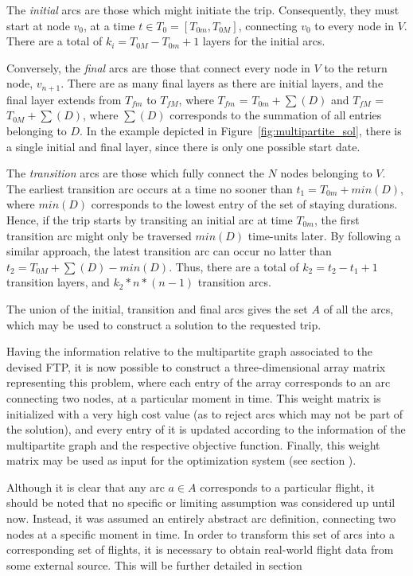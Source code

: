 The \textit{initial} arcs are those which might initiate the trip. Consequently,
they must start at node $v_0$, at a time $t \in T_0 = [T_{0m}, T_{0M}]$,
connecting $v_0$ to every node in $V$. There are a total of $k_i = T_{0M} -
T_{0m} + 1$ layers for the initial arcs.

Conversely, the \textit{final} arcs are those that connect every node in $V$ to
the return node, $v_{n+1}$. There are as many final layers as there are initial
layers, and the final layer extends from $T_{fm}$ to $T_{fM}$, where $T_{fm}$ =
$T_{0m} + \sum(D)$ and $T_{fM}$ = $T_{0M} + \sum(D)$, where $\sum(D)$
corresponds to the summation of all entries belonging to $D$. In the example
depicted in Figure~\ref{fig:multipartite_sol}, there is a single initial and
final layer, since there is only one possible start date.

The \textit{transition} arcs are those which fully connect the $N$ nodes
belonging to $V$. The earliest transition arc occurs at a time no sooner than
$t_1 = T_{0m} + min(D)$, where $min(D)$ corresponds to the lowest entry of the
set of staying durations. Hence, if the trip starts by transiting an initial arc
at time $T_{0m}$, the first transition arc might only be traversed $min(D)$
time-units later. By following a similar approach, the latest transition arc can
occur no latter than $t_2 = T_{0M} + \sum(D) - min(D)$. Thus, there are a total
of $k_2 = t_2-t_1+1$ transition layers, and $k_2*n*(n-1)$ transition arcs.

The union of the initial, transition and final arcs gives the set $A$ of all the
arcs, which may be used to construct a solution to the requested trip. 

Having the information relative to the multipartite graph associated to the
devised FTP, it is now possible to construct a three-dimensional array matrix
representing this problem, where each entry of the array corresponds to an arc
connecting two nodes, at a particular moment in time. This weight matrix is
initialized with a very high cost value (as to reject arcs which may not be part
of the solution), and every entry of it is updated according to the information
of the multipartite graph and the respective objective function. Finally, this
weight matrix may be used as input for the optimization system (see
section
).

Although it is clear that any arc $a \in A$ corresponds to a particular flight,
it should be noted that no specific or limiting assumption was considered up
until now. Instead, it was assumed an entirely abstract arc definition,
connecting two nodes at a specific moment in time. In order to transform this
set of arcs into a corresponding set of flights, it is necessary to obtain
real-world flight data from some external source. This will be further detailed
in section











